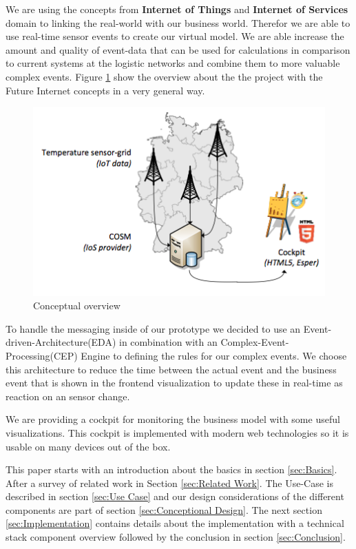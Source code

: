 \documentclass{acm_proc_article-sp}
\begin{document}
We are using the concepts from \textbf{Internet of Things} and \textbf{Internet of Services} domain to linking the real-world with our business world. Therefor we are able to use real-time sensor events to create our virtual model. We are able increase the amount and quality of event-data that can be used for calculations in comparison to current systems at the logistic networks and combine them to more valuable complex events.
Figure \ref{fig:Conceptual overview} show the overview about the the project with the Future Internet concepts in a very general way. 

\begin{figure}[h]
	\begin{center}
		\includegraphics[scale=0.5]{overview.png}
		\caption[Conceptual overview]{Conceptual overview}
		\label{fig:Conceptual overview}
	\end{center}
\end{figure}


To handle the messaging inside of our prototype we decided to use an Event-driven-Architecture(EDA) in combination with an Complex-Event-Processing(CEP) Engine to defining the rules for our complex events. We choose this architecture to reduce the time between the actual event and the business event that is shown in the frontend visualization to update these in real-time as reaction on an sensor change.

We are providing a cockpit for monitoring the business model with some useful visualizations.
This cockpit is implemented with modern web technologies so it is usable on many devices out of the box.

This paper starts with an introduction about the basics in section \ref{sec:Basics}.
After a survey of related work in Section \ref{sec:Related Work}. 
The Use-Case is described in section \ref{sec:Use Case} and our design considerations of the different components are part of section \ref{sec:Conceptional Design}.
The next section \ref{sec:Implementation} contains details about the implementation with a technical stack component overview followed by the conclusion in section \ref{sec:Conclusion}.
\end{document}
